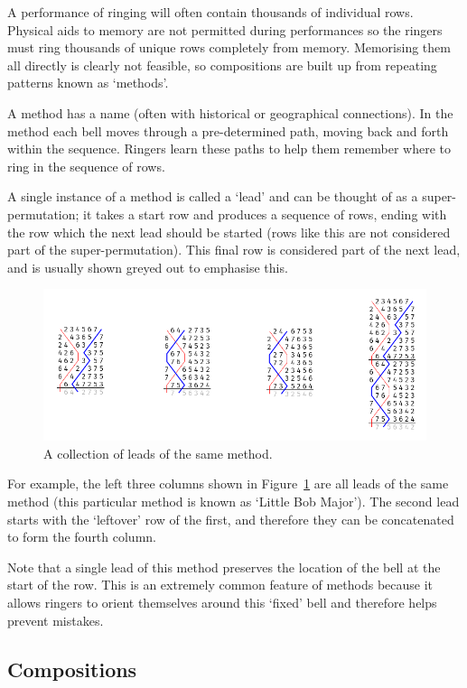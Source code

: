 \documentclass[12pt]{article}
\begin{document}
A performance of ringing will often contain thousands of individual rows.  Physical aids to memory
are not permitted during performances so the ringers must ring thousands of unique rows completely
from memory.  Memorising them all directly is clearly not feasible, so compositions are built up
from repeating patterns known as `methods'.

A method has a name (often with historical or geographical connections). In the method each bell
moves through a pre-determined path, moving back and forth within the sequence. Ringers learn these
paths to help them remember where to ring in the sequence of rows.

A single instance of a method is called a `lead' and can be thought of as a super-permutation; it
takes a start row and produces a sequence of rows, ending with the row which the next lead should be
started (rows like this are not considered part of the super-permutation).  This final row is
considered part of the next lead, and is usually shown greyed out to emphasise this.

\begin{figure}[h!]
    \includegraphics[width=\textwidth]{lb8}
    \caption{A collection of leads of the same method.}\label{fig:little-bob}
\end{figure}

For example, the left three columns shown in Figure~\ref{fig:little-bob} are all leads of the same
method (this particular method is known as `Little Bob Major').  The second lead starts with the
`leftover' row of the first, and therefore they can be concatenated to form the fourth column.

Note that a single lead of this method preserves the location of the bell at the start of the
row.  This is an extremely common feature of methods because it allows ringers to orient
themselves around this `fixed' bell and therefore helps prevent mistakes.

\subsection{Compositions}
\end{document}
